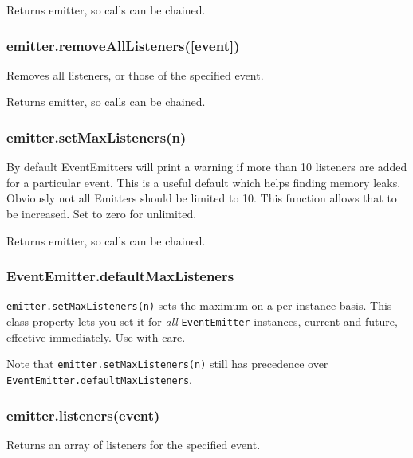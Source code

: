 Returns emitter, so calls can be chained.

\subsubsection{emitter.removeAllListeners({[}event{]})}

Removes all listeners, or those of the specified event.

Returns emitter, so calls can be chained.

\subsubsection{emitter.setMaxListeners(n)}

By default EventEmitters will print a warning if more than 10 listeners
are added for a particular event. This is a useful default which helps
finding memory leaks. Obviously not all Emitters should be limited to
10. This function allows that to be increased. Set to zero for
unlimited.

Returns emitter, so calls can be chained.

\subsubsection{EventEmitter.defaultMaxListeners}

\texttt{emitter.setMaxListeners(n)} sets the maximum on a per-instance
basis. This class property lets you set it for \emph{all}
\texttt{EventEmitter} instances, current and future, effective
immediately. Use with care.

Note that \texttt{emitter.setMaxListeners(n)} still has precedence over
\texttt{EventEmitter.defaultMaxListeners}.

\subsubsection{emitter.listeners(event)}

Returns an array of listeners for the specified event.

\begin{Shaded}
\begin{Highlighting}[]
\NormalTok{(}\NormalTok{, } 
  \NormalTok{(}\NormalTok{);}
\NormalTok{\});}
\NormalTok{(}\NormalTok{(}\NormalTok{(}\NormalTok{))); }\CommentTok{// [ [Function] ]}
\end{Highlighting}
\end{Shaded}

